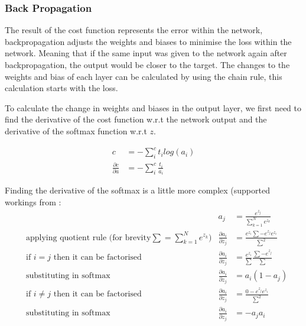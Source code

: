 \subsubsection{Back Propagation}
The result of the cost function represents the error within the network,
backpropagation adjusts the weights and biases to minimise the loss
 within the network. Meaning that if the same input was
given to the network again after backpropagation, the output would be closer to
the target. The changes to the weights and bias of each layer can be calculated
by using the chain rule, this calculation starts with the loss.

To calculate the change in weights and biases in the output layer, we first need
to find the derivative of the cost function w.r.t the network output and the
derivative of the softmax function w.r.t \(z\).

\begin{equation}
    \begin{aligned}
        c &= - \sum_{i}^{c} t_{i}log(a_{i}) \\
        \frac{\partial c}{\partial a} &= - \sum_{i}^{c} \frac{t_{i}}{a_{i}}
    \end{aligned}
\end{equation}

Finding the derivative of the softmax is a little more complex (supported
workings from \cite{peterSadowski}:
\begin{equation}
    \begin{aligned}
        &       &   a_{j} &= \frac{e^{z_{j}}}{\sum_{k=1}^{N} e^{z_{k}}} \\
        &\text{applying quotient rule (for brevity} \sum = \sum_{k=1}^{N} e^{z_{k}} \text{)}   &   \frac{\partial a_{i}}{\partial z_{j}} &= \frac{e^{z_{i}} \sum - e^{z_{j}}e^{z_{i}}}{\sum^{2}}\\[2em]
        &\text{if } i=j \text{ then it can be factorised}     &   \frac{\partial a_{i}}{\partial z_{j}} &= \frac{e^{z_{i}}}{\sum} \frac{\sum - e^{z_{j}}}{\sum}\\
        &\text{substituting in softmax}     &   \frac{\partial a_{i}}{\partial z_{j}} &= a_{i} (1 - a_{j})\\[2em]
        &\text{if } i \neq j \text{ then it can be factorised}      &   \frac{\partial a_{i}}{\partial z_{j}} &= \frac{0 - e^{z_{j}}e^{z_{i}}}{\sum^{2}}\\
        &\text{substituting in softmax}     &   \frac{\partial a_{i}}{\partial z_{j}} &= -a_{j}a_{i}
    \end{aligned}
\end{equation}

